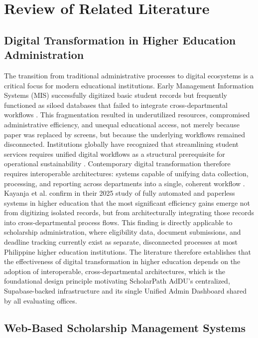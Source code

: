 \chapter{Review of Related Literature}
\label{ch:rrl}

\section{Digital Transformation in Higher Education Administration}

The transition from traditional administrative processes to digital ecosystems is a critical focus for modern educational institutions. Early Management Information Systems (MIS) successfully digitized basic student records but frequently functioned as siloed databases that failed to integrate cross-departmental workflows \cite{ref3,ref5}. This fragmentation resulted in underutilized resources, compromised administrative efficiency, and unequal educational access, not merely because paper was replaced by screens, but because the underlying workflows remained disconnected. Institutions globally have recognized that streamlining student services requires unified digital workflows as a structural prerequisite for operational sustainability \cite{ref46}. Contemporary digital transformation therefore requires interoperable architectures: systems capable of unifying data collection, processing, and reporting across departments into a single, coherent workflow \cite{ref36}. Kayanja et al. \cite{ref46} confirm in their 2025 study of fully automated and paperless systems in higher education that the most significant efficiency gains emerge not from digitizing isolated records, but from architecturally integrating those records into cross-departmental process flows. This finding is directly applicable to scholarship administration, where eligibility data, document submissions, and deadline tracking currently exist as separate, disconnected processes at most Philippine higher education institutions. The literature therefore establishes that the effectiveness of digital transformation in higher education depends on the adoption of interoperable, cross-departmental architectures, which is the foundational design principle motivating ScholarPath AdDU's centralized, Supabase-backed infrastructure and its single Unified Admin Dashboard shared by all evaluating offices.

\section{Web-Based Scholarship Management Systems}

